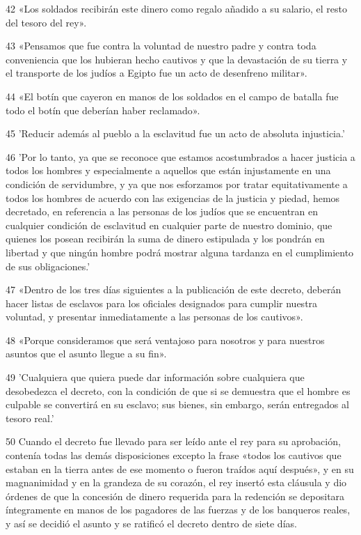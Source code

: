 \par 42 «Los soldados recibirán este dinero como regalo añadido a su salario, el resto del tesoro del rey».

\par 43 «Pensamos que fue contra la voluntad de nuestro padre y contra toda conveniencia que los hubieran hecho cautivos y que la devastación de su tierra y el transporte de los judíos a Egipto fue un acto de desenfreno militar».

\par 44 «El botín que cayeron en manos de los soldados en el campo de batalla fue todo el botín que deberían haber reclamado».

\par 45 'Reducir además al pueblo a la esclavitud fue un acto de absoluta injusticia.'

\par 46 'Por lo tanto, ya que se reconoce que estamos acostumbrados a hacer justicia a todos los hombres y especialmente a aquellos que están injustamente en una condición de servidumbre, y ya que nos esforzamos por tratar equitativamente a todos los hombres de acuerdo con las exigencias de la justicia y piedad, hemos decretado, en referencia a las personas de los judíos que se encuentran en cualquier condición de esclavitud en cualquier parte de nuestro dominio, que quienes los posean recibirán la suma de dinero estipulada y los pondrán en libertad y que ningún hombre podrá mostrar alguna tardanza en el cumplimiento de sus obligaciones.'

\par 47 «Dentro de los tres días siguientes a la publicación de este decreto, deberán hacer listas de esclavos para los oficiales designados para cumplir nuestra voluntad, y presentar inmediatamente a las personas de los cautivos».

\par 48 «Porque consideramos que será ventajoso para nosotros y para nuestros asuntos que el asunto llegue a su fin».

\par 49 'Cualquiera que quiera puede dar información sobre cualquiera que desobedezca el decreto, con la condición de que si se demuestra que el hombre es culpable se convertirá en su esclavo; sus bienes, sin embargo, serán entregados al tesoro real.'

\par 50 Cuando el decreto fue llevado para ser leído ante el rey para su aprobación, contenía todas las demás disposiciones excepto la frase «todos los cautivos que estaban en la tierra antes de ese momento o fueron traídos aquí después», y en su magnanimidad y en la grandeza de su corazón, el rey insertó esta cláusula y dio órdenes de que la concesión de dinero requerida para la redención se depositara íntegramente en manos de los pagadores de las fuerzas y de los banqueros reales, y así se decidió el asunto y se ratificó el decreto dentro de siete días.

